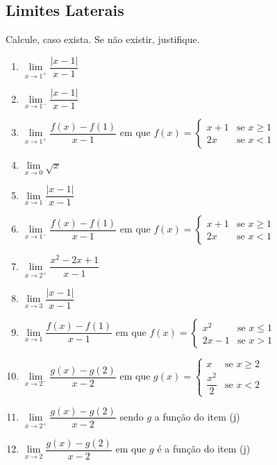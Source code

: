 \clearpage

\subsection{Limites Laterais}

\begin{exercicio}[1]
Calcule, caso exista. Se não existir, justifique.
\begin{enumerate}[label=\alph*)]
    \item $\lim\limits_{x \to 1^+} \dfrac{|x - 1|}{x - 1}$
    \item $\lim\limits_{x \to 1^-} \dfrac{|x - 1|}{x - 1}$
    \item $\lim\limits_{x \to 1^+} \dfrac{f(x) - f(1)}{x - 1}$ em que $f(x) = \begin{cases} x + 1 & \text{se } x \ge 1 \\ 2x & \text{se } x < 1 \end{cases}$
    \item $\lim\limits_{x \to 0} \sqrt{x}$
    \item $\lim\limits_{x \to 1} \dfrac{|x - 1|}{x - 1}$
    \item $\lim\limits_{x \to 1^-} \dfrac{f(x) - f(1)}{x - 1}$ em que $f(x) = \begin{cases} x + 1 & \text{se } x \ge 1 \\ 2x & \text{se } x < 1 \end{cases}$
    \item $\lim\limits_{x \to 2^+} \dfrac{x^2 - 2x + 1}{x - 1}$
    \item $\lim\limits_{x \to 3} \dfrac{|x - 1|}{x - 1}$
    \item $\lim\limits_{x \to 1} \dfrac{f(x) - f(1)}{x - 1}$ em que $f(x) = \begin{cases} x^2 & \text{se } x \le 1 \\ 2x - 1 & \text{se } x > 1 \end{cases}$
    \item $\lim\limits_{x \to 2^-} \dfrac{g(x) - g(2)}{x - 2}$ em que $g(x) = \begin{cases} x & \text{se } x \ge 2 \\ \dfrac{x^2}{2} & \text{se } x < 2 \end{cases}$
    \item $\lim\limits_{x \to 2^+} \dfrac{g(x) - g(2)}{x - 2}$ sendo $g$ a função do item (j)
    \item $\lim\limits_{x \to 2} \dfrac{g(x) - g(2)}{x - 2}$ em que $g$ é a função do item (j)
\end{enumerate}
\end{exercicio}

